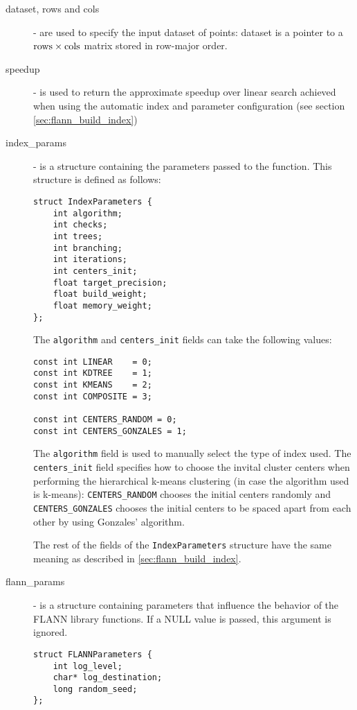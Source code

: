 \documentclass[letter,10pt]{article}
\begin{document}
\begin{description}
 \item[dataset, rows and cols] - are used to specify the input dataset of
points: dataset is a pointer to a $\rm{rows} \times \rm{cols}$ matrix
stored in row-major order.
\item [speedup] - is used to return the approximate speedup over linear
search achieved when using the automatic index and parameter configuration
(see section \ref{sec:flann_build_index})
\item [index\_params] - is a structure containing the parameters passed to
the function. This structure is defined as follows:
\begin{Verbatim}[fontsize=\footnotesize]
struct IndexParameters {
    int algorithm;
    int checks;
    int trees;
    int branching;
    int iterations;
    int centers_init;
    float target_precision;
    float build_weight;
    float memory_weight;
};
\end{Verbatim}

The \texttt{algorithm} and \texttt{centers\_init} fields can take the
following values:
\begin{Verbatim}[fontsize=\footnotesize]
const int LINEAR    = 0;
const int KDTREE    = 1;
const int KMEANS    = 2;
const int COMPOSITE = 3;

const int CENTERS_RANDOM = 0;
const int CENTERS_GONZALES = 1;
\end{Verbatim}
The \texttt{algorithm} field is used to manually select the type of index
used. The \texttt{centers\_init} field specifies how to choose the invital
cluster centers when performing the hierarchical k-means clustering (in
case the algorithm used is k-means): \texttt{CENTERS\_RANDOM} chooses the
initial centers randomly and \texttt{CENTERS\_GONZALES} chooses the
initial centers to be spaced apart from each other by using Gonzales' algorithm.

The rest of the fields of the \texttt{IndexParameters} structure have the
same meaning as described in \ref{sec:flann_build_index}.

\item [flann\_params] - is a structure containing parameters that influence the
behavior of the FLANN library functions. If a NULL value is passed, this
argument is ignored.
\begin{Verbatim}[fontsize=\footnotesize]
struct FLANNParameters {
    int log_level;
    char* log_destination;
    long random_seed;
};
\end{Verbatim}


\end{description}
\end{document}
